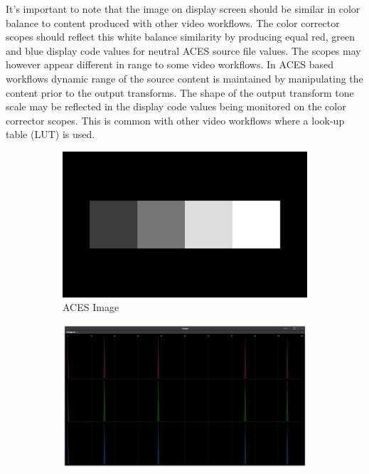 It's important to note that the image on display screen should be similar in color balance to content produced with other video workflows. The color corrector scopes should reflect this white balance similarity by producing equal red, green and blue display code values for neutral ACES source file values. The scopes may however appear different in range to some video workflows.  In ACES based workflows dynamic range of the source content is maintained by manipulating the content prior to the output transforms.  The shape of the output transform tone scale may be reflected in the display code values being monitored on the color corrector scopes.  This is common with other video workflows where a look-up table (LUT) is used.

    \begin{figure}[ht!]
        \centering
        \begin{subfigure}[b]{0.475\textwidth}
            \centering
            \includegraphics[width=\textwidth]{images/aces}
            \caption[Source ACES Image]%
            {{\small ACES Image}}    
            \label{fig:acesSource-rec709}
        \end{subfigure}
        \hfill
        \begin{subfigure}[b]{0.475\textwidth}  
            \centering 
            \includegraphics[width=\textwidth]{images/rec709/rec709_histogram}

\end{subfigure}
\end{figure}
